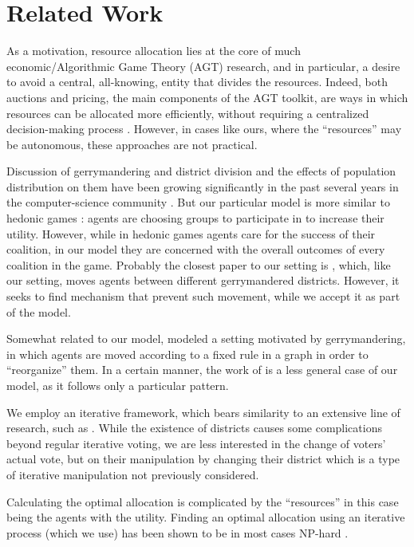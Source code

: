 \documentclass[letterpaper]{article} %
\begin{document}
\section{Related Work}
As a motivation, resource allocation lies at the core of much economic/Algorithmic Game Theory (AGT) research, and in particular, a desire to avoid a central, all-knowing, entity that divides the resources. Indeed, both auctions and pricing, the main components of the AGT toolkit, are ways in which resources can be allocated more efficiently, without requiring a centralized decision-making process \cite{Kri02,NRTV07}. However, in cases like ours, where the ``resources'' may be autonomous, these approaches are not practical.

Discussion of gerrymandering and district division and the effects of population distribution on them have been growing significantly in the past several years in the computer-science community \cite{BLLZ16,LLR17,cohen2018gerrymandering,BLSS18}. But our particular model is more similar to hedonic games \cite{BCELP1615}: agents are choosing groups to participate in to increase their utility. However, while in hedonic games agents care for the success of their coalition, in our model they are concerned with the overall outcomes of every coalition in the game. Probably the closest paper to our setting is \cite{BM12}, which, like our setting, moves agents between different gerrymandered districts. However, it seeks to find mechanism that prevent such movement, while we accept it as part of the model.

Somewhat related to our model, \cite{BBCFNW15} modeled a setting motivated by gerrymandering, in which agents are moved according to a fixed rule in a graph in order to ``reorganize'' them. In a certain manner, the work of \cite{BBCFNW15} is a less general case of our model, as it follows only a particular pattern.

We employ an iterative framework, which bears similarity to an extensive line of research, such as \cite{MPRJ10,LR16,GLRVW13,Mei16,ROLMR15}. While the existence of districts causes some complications beyond regular iterative voting, we are less interested in the change of voters' actual vote, but on their manipulation by changing their district which is a type of iterative manipulation not previously considered.

Calculating the optimal allocation is complicated by the ``resources'' in this case being the agents with the utility. Finding an optimal allocation using an iterative process (which we use) has been shown to be in most cases NP-hard \cite{AKWX16}.
\end{document}
